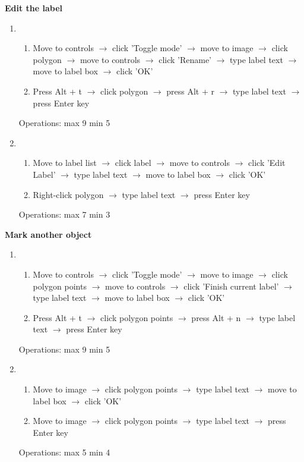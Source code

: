 \documentclass[a4paper,11pt,oneside]{article}
\begin{document}
{\bf Edit the label}
\begin{enumerate}
    \item
    \begin{enumerate}
        \item Move to controls $\rightarrow$ click 'Toggle mode' $\rightarrow$ move to image $\rightarrow$ click polygon $\rightarrow$ move to controls $\rightarrow$ click 'Rename' $\rightarrow$ type label text $\rightarrow$ move to label box $\rightarrow$ click 'OK'
        \item Press Alt + t $\rightarrow$ click polygon $\rightarrow$ press Alt + r $\rightarrow$ type label text $\rightarrow$ press Enter key
    \end{enumerate}
    Operations: max 9 min 5
    \item
    \begin{enumerate}
        \item Move to label list $\rightarrow$ click label $\rightarrow$ move to controls $\rightarrow$ click 'Edit Label' $\rightarrow$ type label text $\rightarrow$ move to label box $\rightarrow$ click 'OK'
        \item Right-click polygon $\rightarrow$ type label text $\rightarrow$ press Enter key
    \end{enumerate}
    Operations: max 7 min 3
\end{enumerate}

{\bf Mark another object}
\begin{enumerate}
    \item
    \begin{enumerate}
        \item Move to controls $\rightarrow$ click 'Toggle mode' $\rightarrow$ move to image $\rightarrow$ click polygon points $\rightarrow$ move to controls $\rightarrow$ click 'Finish current label' $\rightarrow$ type label text $\rightarrow$ move to label box $\rightarrow$ click 'OK'
        \item Press Alt + t $\rightarrow$ click polygon points $\rightarrow$ press Alt + n $\rightarrow$ type label text $\rightarrow$ press Enter key
    \end{enumerate}
    Operations: max 9 min 5
    \item
    \begin{enumerate}
        \item Move to image $\rightarrow$ click polygon points $\rightarrow$ type label text $\rightarrow$ move to label box $\rightarrow$ click 'OK'
        \item Move to image $\rightarrow$ click polygon points $\rightarrow$ type label text $\rightarrow$ press Enter key
    \end{enumerate}
    Operations: max 5 min 4
\end{enumerate}
\end{document}
